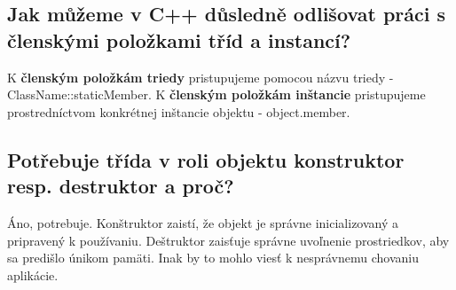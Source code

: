\subsection{Jak můžeme v C++ důsledně odlišovat práci s členskými položkami tříd a
instancí?}
K \textbf{členským položkám triedy} pristupujeme pomocou názvu triedy - ClassName::staticMember. \newline
K \textbf{členským položkám inštancie} pristupujeme prostredníctvom konkrétnej inštancie objektu - object.member.

\subsection{Potřebuje třída v roli objektu konstruktor resp. destruktor a proč?}
Áno, potrebuje. Konštruktor zaistí, že objekt je správne inicializovaný a pripravený k používaniu. Deštruktor zaisťuje správne uvoľnenie prostriedkov, aby sa predišlo únikom pamäti. Inak by to mohlo viesť k nesprávnemu chovaniu aplikácie.